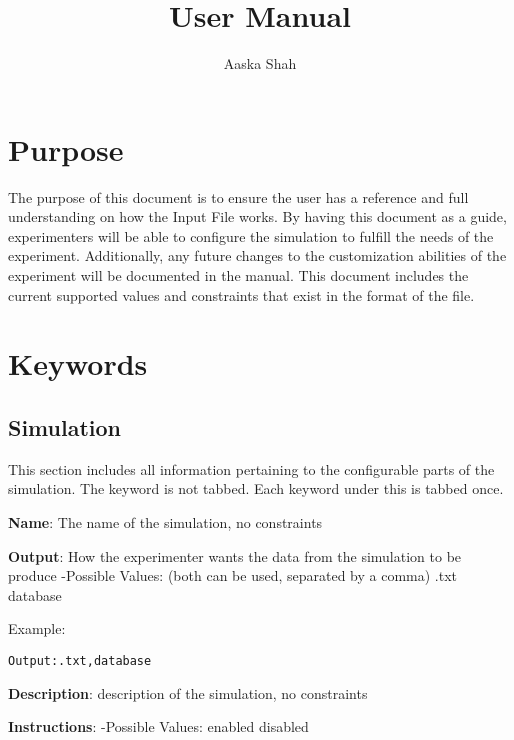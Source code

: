 \documentclass{article}
\title{User Manual}
\author{Aaska Shah}
\begin{document}
\maketitle

\section{Purpose}
The purpose of this document is to ensure the user has a reference and full understanding on how the Input File works. By having this document as a guide, experimenters will be able to configure the simulation to fulfill the needs of the experiment. Additionally, any future changes to the customization abilities of the experiment will be documented in the manual. This document includes the current supported values and constraints that exist in the format of the file. 

\section{Keywords}
\subsection{Simulation}
This section includes all information pertaining to the configurable parts of the simulation. The keyword is not tabbed. Each keyword under this is tabbed once.\newline

\noindent \textbf{Name}: The name of the simulation, no constraints \newline

\noindent \textbf{Output}: How the experimenter wants the data from the simulation to be produce\newline
\indent -Possible Values: (both can be used, separated by a comma)\newline
\indent\indent .txt \newline
\indent\indent database \newline

\noindent Example:
\begin{lstlisting}
Output:.txt,database
\end{lstlisting}

\noindent \textbf{Description}: description of the simulation, no constraints 

\noindent \textbf{Instructions}: \newline
\indent -Possible Values:\newline
\indent\indent enabled\newline
\indent\indent disabled\newline
\end{document}
